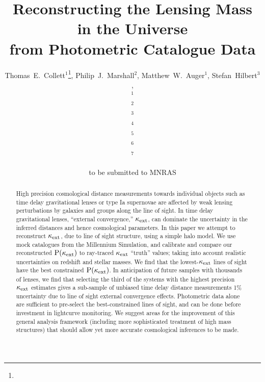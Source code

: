 \documentclass[useAMS,usenatbib,a4paper]{mn2e}
\title[Line of Sight Mass Reconstruction]
{Reconstructing the Lensing Mass in the Universe \\
from Photometric Catalogue Data}
\author[Collett \etal]{%
  Thomas~E.~Collett$^{1}$\thanks{\collettemail},
  Philip~J.~Marshall$^{2}$,
  Matthew~W.~Auger$^{1}$,
  Stefan~Hilbert$^{3}$,
\newauthor{%
  Sherry~H.~Suyu$^{4,3,5}$,
  Zachary~Greene$^{4}$,
  Tommaso~Treu$^{4}$\thanks{\packard},
  Christopher~D.~Fassnacht$^{6}$,}
\newauthor{%
  L\'eon~V.~E.~Koopmans$^{7}$,
  Maru\v{s}a Brada\v{c}$^{6}$,
  Roger~D.~Blandford$^{3}$} 
  \medskip\\
  $^1$\ioa\\
  $^2$\oxford\\
  $^3$\kipac\\
  $^4$\ucsb\\
  $^5$\asiaa\\
  $^6$\davis\\
  $^7$\kapteyn
}
\begin{document}
             
\date{to be submitted to MNRAS}
\pagerange{\pageref{firstpage}--\pageref{lastpage}}

\maketitle           

\label{firstpage}


\begin{abstract} 

High precision cosmological distance measurements towards individual objects
such as time delay gravitational lenses or type Ia supernovae are affected by
weak lensing perturbations by galaxies and groups along the line of sight. In
time delay gravitational lenses, ``external convergence,'' $\kappa_{\rm ext}$, can
dominate the uncertainty in the inferred distances and hence cosmological parameters.
 In this paper we attempt
to reconstruct $\kappa_{\rm ext}$, due to line of sight structure, using a simple halo
model.
%
We use mock catalogues from the Millennium Simulation, and calibrate and 
compare our reconstructed ${\rm P}(\kappa_{\rm ext})$ to ray-traced $\kappa_{\rm ext}$ ``truth''
values; taking into account realistic uncertainties on redshift and stellar
masses.  
%
We find that the lowest-$\kappa_{\rm ext}$ lines of sight have the best constrained 
${\rm P}(\kappa_{\rm ext})$. In anticipation of future samples with thousands of lenses,
we find that selecting the third of the systems with the
highest precision $\kappa_{\rm ext}$ estimates gives a  sub-sample of unbiased time
delay distance measurements  1\% uncertainty due
to line of sight external convergence effects. Photometric data alone are
sufficient to pre-select the best-constrained lines of sight, and can be done
before investment in lightcurve monitoring. 
%
  We suggest areas for the
improvement of this general analysis framework (including more sophisticated
treatment of high mass structures) that should allow yet more accurate
cosmological inferences to be made.

\end{abstract}
\end{document}
